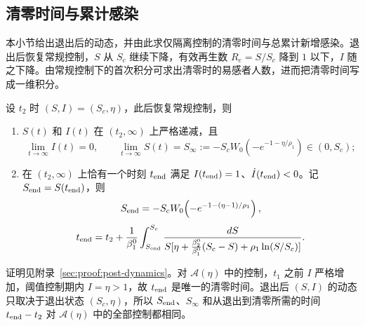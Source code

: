 \subsection{清零时间与累计感染}
本小节给出退出后的动态，并由此求仅隔离控制的清零时间与总累计新增感染。退出后恢复常规控制，$S$ 从 $S_c$ 继续下降，有效再生数 $R_e=S/S_c$ 降到 $1$ 以下，$I$ 随之下降。由常规控制下的首次积分可求出清零时的易感者人数，进而把清零时间写成一维积分。
\begin{theorem}
\label{thm:s1:tend}\label{thm:s1:post}
设 $t_2$ 时 $(S,I)=(S_c,\eta)$，此后恢复常规控制，则
\begin{enumerate}
\renewcommand{\labelenumi}{(\roman{enumi})}
\item $S(t)$ 和 $I(t)$ 在 $(t_2,\infty)$ 上严格递减，且
\begin{equation}
\lim_{t\to\infty}I(t)=0,\qquad
\lim_{t\to\infty}S(t)=S_\infty:=-S_cW_0\!\left(-e^{-1-\eta/\rho_1}\right)\in(0,S_c);
\label{eq:s1:Sinfty}
\end{equation}
\item 在 $(t_2,\infty)$ 上恰有一个时刻 $t_{\rm end}$ 满足 $I(t_{\rm end})=1$、$\dot I(t_{\rm end})<0$。记 $S_{\rm end}=S(t_{\rm end})$，则
\begin{equation}
S_{\rm end}=-S_cW_0\!\left(-e^{-1-(\eta-1)/\rho_1}\right),
\label{eq:s1:Send}
\end{equation}
\begin{equation}
t_{\rm end}=t_2+\frac{1}{\beta_1^0}\int_{S_{\rm end}}^{S_c}
\frac{dS}{S[\eta+\frac{\beta_2^0}{\beta_1^0}(S_c-S)+\rho_1\ln(S/S_c)]}.
\label{eq:s1:tend}
\end{equation}
\end{enumerate}
\end{theorem}
证明见附录~\ref{sec:proof:post-dynamics}。对 $\mathcal A(\eta)$ 中的控制，$t_1$ 之前 $I$ 严格增加，阈值控制期内 $I=\eta>1$，故 $t_{\rm end}$ 是唯一的清零时间。退出后 $(S,I)$ 的动态只取决于退出状态 $(S_c,\eta)$，所以 $S_{\rm end}$、$S_\infty$ 和从退出到清零所需的时间 $t_{\rm end}-t_2$ 对 $\mathcal A(\eta)$ 中的全部控制都相同。

